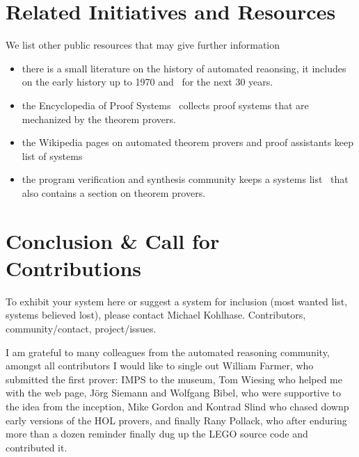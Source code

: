 \documentclass[smallcondensed]{svjour3}
\begin{document}
\section{Related Initiatives and Resources}
We list other public resources that may give further information
\begin{itemize}
\item there is a small literature on the history of automated reaonsing, it
  includes~\cite{Bibel:ehpad07} on the early history up to 1970 and~\cite{RobVor:hoar01}
  for the next 30 years. 
\item the Encyclopedia of Proof Systems~\cite{Wolzenlogel-Paleo:teps17} collects proof
  systems that are mechanized by the theorem provers.
\item the Wikipedia pages on automated theorem provers and proof assistants keep list of systems
\item the program verification and synthesis community keeps a systems
  list~\cite{vsstp:on} that also contains a section on theorem provers.
\end{itemize}

\section{Conclusion \& Call for Contributions}\label{sec:concl}

To exhibit your system here or suggest a system for inclusion (most wanted
list, systems believed lost), please contact Michael Kohlhase. Contributors,
community/contact, project/issues.

\begin{acknowledgements}
  I am grateful to many colleagues from the automated reasoning community, amongst all
  contributors I would like to single out William Farmer, who submitted the first prover:
  IMPS to the museum, Tom Wiesing who helped me with the web page, J\"org Siemann and
  Wolfgang Bibel, who were supportive to the idea from the inception, Mike Gordon and
  Kontrad Slind who chased downp early versions of the HOL provers, and finally Rany
  Pollack, who after enduring more than a dozen reminder finally dug up the LEGO source
  code and contributed it.
\end{acknowledgements}

\printbibliography
\end{document}
